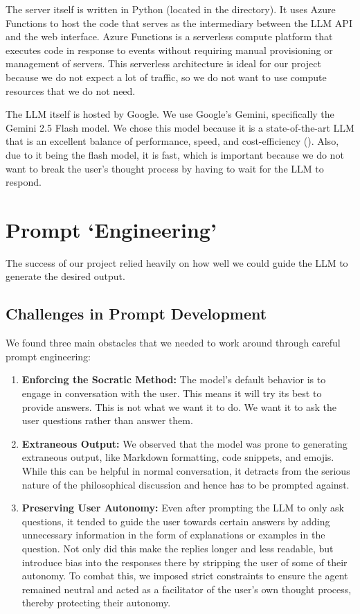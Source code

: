 \documentclass[letterpaper,11pt,leqno]{article}
\newcommand{\link}[2]{
  \underbar{\bf \href{#1}{#2}}
}
\begin{document}
The server itself is written in Python (located in the \link{https://github.com/amuhak/PHIL-4176/blob/main/api}{/api} directory). It uses Azure Functions to host the code that serves as the intermediary between the LLM API and the web interface. Azure Functions is a serverless compute platform that executes code in response to events without requiring manual provisioning or management of servers. This serverless architecture is ideal for our project because we do not expect a lot of traffic, so we do not want to use compute resources that we do not need.

The LLM itself is hosted by Google. We use Google's Gemini, specifically the Gemini 2.5 Flash model. We chose this model because it is a state-of-the-art LLM that is an excellent balance of performance, speed, and cost-efficiency (\cite{GeminiFlash}). Also, due to it being the flash model, it is fast, which is important because we do not want to break the user's thought process by having to wait for the LLM to respond.

\section{Prompt `Engineering'}

The success of our project relied heavily on how well we could guide the LLM to generate the desired output.

\subsection{Challenges in Prompt Development}

We found three main obstacles that we needed to work around through careful prompt engineering:

\begin{enumerate}[label=\textbf{\arabic*.}]
  \item \textbf{Enforcing the Socratic Method: } The model's default behavior is to engage in conversation with the user. This means it will try its best to provide answers. This is not what we want it to do. We want it to ask the user questions rather than answer them.

  \item \textbf{Extraneous Output: } We observed that the model was prone to generating extraneous output, like Markdown formatting, code snippets, and emojis. While this can be helpful in normal conversation, it detracts from the serious nature of the philosophical discussion and hence has to be prompted against.

  \item \textbf{Preserving User Autonomy: } Even after prompting the LLM to only ask questions, it tended to guide the user towards certain answers by adding unnecessary information in the form of explanations or examples in the question. Not only did this make the replies longer and less readable, but introduce bias into the responses there by stripping the user of some of their autonomy. To combat this, we imposed strict constraints to ensure the agent remained neutral and acted as a facilitator of the user's own thought process, thereby protecting their autonomy.
\end{enumerate}
\end{document}
